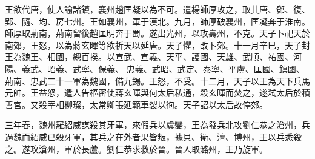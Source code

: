 \begin{pinyinscope}
 王欲代唐，使人諭諸鎮，襄州趙匡凝以為不可。遣楊師厚攻之，取其唐、鄧、復、郢、隨、均、房七州。王如襄州，軍于漢北。九月，師厚破襄州，匡凝奔于淮南。師厚取荊南，荊南留後趙匡明奔于蜀。遂出光州，以攻壽州，不克。天子卜祀天於南郊，王怒，以為蔣玄暉等欲祈天以延唐。天子懼，改卜郊。十一月辛巳，天子封王為魏王、相國，總百揆。以宣武、宣義、天平、護國、天雄、武順、祐國、河陽、義武、昭義、武寧、保義、
 忠義、武昭、武定、泰寧、平盧、匡國、鎮國、荊南、忠武二十一軍為魏國，備九錫。王怒，不受。十二月，天子以王為天下兵馬元帥。王益怒，遣人告樞密使蔣玄暉與何太后私通，殺玄暉而焚之，遂弒太后於積善宮。又殺宰相柳璨，太常卿張延範車裂以徇。天子詔以太后故停郊。



 三年春，魏州羅紹威謀殺其牙軍，來假兵以虞變，王為發兵北攻劉仁恭之滄州，兵過魏而紹威已殺牙軍，其兵之在外者果皆叛，據貝、衛、澶、博州，王以兵悉殺之。遂攻滄州，軍於長蘆。劉仁恭求救於晉。晉人取潞州，王乃旋軍。



\end{pinyinscope}